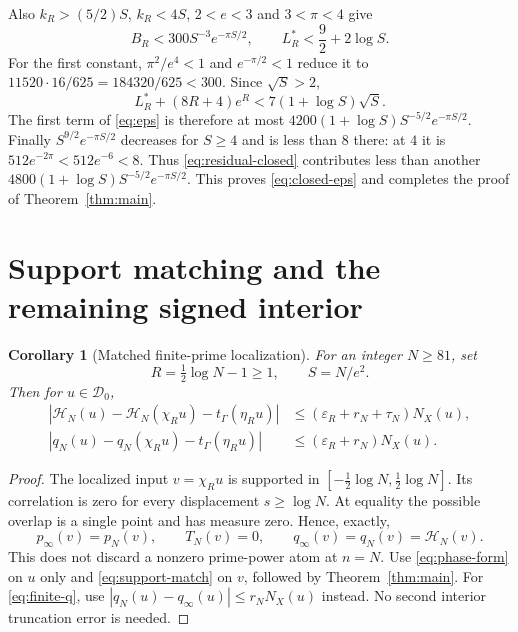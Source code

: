 \documentclass[11pt]{article}
\newtheorem{corollary}[theorem]{Corollary}
\theoremstyle{remark}\newtheorem{remark}[theorem]{Remark}
\newcommand{\HH}{\mathcal H}
\numberwithin{equation}{section}
\begin{document}
Also $k_R>(5/2)S$, $k_R<4S$, $2<e<3$ and $3<\pi<4$ give
\begin{equation}\label{eq:B-closed}
 B_R<300S^{-3}e^{-\pi S/2},\qquad
 L_R^*<\frac92+2\log S.
\end{equation}
For the first constant, $\pi^2/e^4<1$ and $e^{-\pi/2}<1$ reduce it
to $11520\cdot16/625=184320/625<300$. Since $\sqrt S>2$,
\[
 L_R^*+(8R+4)e^R<7(1+\log S)\sqrt S.
\]
The first term of \eqref{eq:eps} is therefore at most
$4200(1+\log S)S^{-5/2}e^{-\pi S/2}$. Finally
$S^{9/2}e^{-\pi S/2}$ decreases for $S\ge4$ and is less than $8$ there:
at $4$ it is $512e^{-2\pi}<512e^{-6}<8$. Thus
\eqref{eq:residual-closed} contributes less than another
$4800(1+\log S)S^{-5/2}e^{-\pi S/2}$. This proves
\eqref{eq:closed-eps} and completes the proof of
Theorem~\ref{thm:main}.

\section{Support matching and the remaining signed interior}

\begin{corollary}[Matched finite-prime localization]\label{cor:finiteN}
For an integer $N\ge81$, set
\begin{equation}\label{eq:matched-R}
 R=\tfrac12\log N-1\ge1,\qquad S=N/e^2.
\end{equation}
Then for $u\in\mathcal D_0$,
\begin{align}
 \left|\HH_N(u)-\HH_N(\chi_Ru)-t_\Gamma(\eta_Ru)\right|
       &\le(\varepsilon_R+r_N+\tau_N)N_X(u),\label{eq:finite-H}\\
 \left|q_N(u)-q_N(\chi_Ru)-t_\Gamma(\eta_Ru)\right|
       &\le(\varepsilon_R+r_N)N_X(u).\label{eq:finite-q}
\end{align}
\end{corollary}
\begin{proof}
The localized input $v=\chi_Ru$ is supported in
$[-\tfrac12\log N,\tfrac12\log N]$. Its correlation is zero for every
displacement $s\ge\log N$. At equality the possible overlap is a single
point and has measure zero. Hence, exactly,
\begin{equation}\label{eq:support-match}
 p_\infty(v)=p_N(v),\qquad T_N(v)=0,\qquad
 q_\infty(v)=q_N(v)=\HH_N(v).
\end{equation}
This does not discard a nonzero prime-power atom at $n=N$.
Use \eqref{eq:phase-form} on $u$ only and
\eqref{eq:support-match} on $v$, followed by Theorem~\ref{thm:main}.
For \eqref{eq:finite-q}, use
$|q_N(u)-q_\infty(u)|\le r_NN_X(u)$ instead. No second interior
truncation error is needed.
\end{proof}
\end{document}
